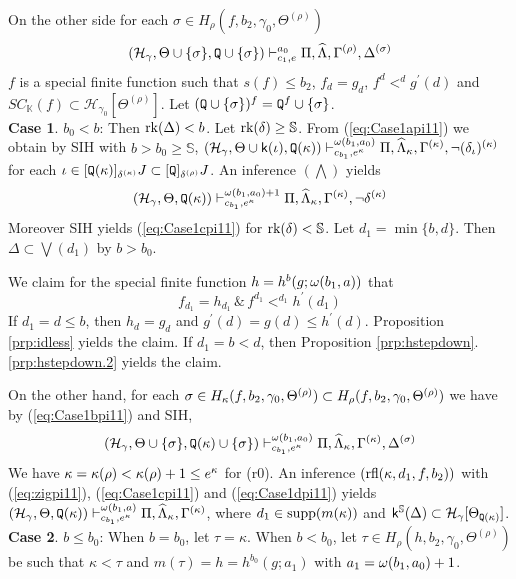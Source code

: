 \documentclass{article}
\newcommand{\mS}{\mathbb{S}}
\newcommand{\mK}{\mathbb{K}}
\begin{document}
On the other side for each $\sigma\in H_{\rho}(f,b_{2},\gamma_{0},\Theta^{(\rho)})$
\begin{equation}\label{eq:Case1bpi11}
(\mathcal{H}_{\gamma},\Theta\cup\{\sigma\},
{\tt Q}\cup\{\sigma\}
)
\vdash^{a_{0}}_{c_{1},e}
\Pi,\widehat{\Lambda},\Gamma^{(\rho)},  \Delta^{(\sigma)}
\end{equation}
$f$ is a special finite function such that $s(f)\leq b_{2}$,
$f_{d}=g_{d}$, $f^{d}<^{d}g^{\prime}(d)$ and
$SC_{\mK}(f)\subset\mathcal{H}_{\gamma_{0}}[\Theta^{(\rho)}]$.
Let $({\tt Q}\cup\{\sigma\})^{f}={\tt Q}^{f}\cup\{\sigma\}$.
\\
\textbf{Case 1}. 
$b_{0}<b$:
Then ${\rm rk}(\Delta)<b$.
Let $\rk(\del)\geq\mS$.
From (\ref{eq:Case1api11}) 
we obtain by SIH with $b>b_{0}\geq\mathbb{S}$,
$(\mathcal{H}_{\gamma},\Theta\cup{\sf k}(\iota),
{\tt Q}(\kappa)
)
\vdash^{\omega(b_{1},a_{0})}_{c_{b_{1}},e^{\kappa}}
\Pi,\widehat{\Lambda}_{\kappa},\Gamma^{(\kappa)},\lnot(\delta_{\iota})^{(\kappa)}$
for each $\iota\in [{\tt Q}(\kappa)]_{\delta^{(\kappa)}}J\subset [{\tt Q}]_{\delta^{(\rho)}}J$.
An inference $(\bigwedge)$ yields
\begin{equation}\label{eq:Case1cpi11}
(\mathcal{H}_{\gamma},\Theta,
{\tt Q}(\kappa)
)
\vdash^{\omega(b_{1},a_{0})+1}_{c_{b_{1}},e^{\kappa}}
\Pi,\widehat{\Lambda}_{\kappa},\Gamma^{(\kappa)},\lnot\delta^{(\kappa)}
\end{equation}
Moreover SIH yields (\ref{eq:Case1cpi11}) for $\rk(\del)<\mS$.
Let 
$d_{1}=\min\{b,d\}$.
Then $\Delta\subset\bigvee(d_{1})$ by $b> b_{0}$.

We claim for the special finite function $h=h^{b}(g;\omega(b_{1},a))$ that
\begin{equation}\label{eq:zigpi11}
f_{d_{1}}=h_{d_{1}} \,\&\,
f^{d_{1}}<^{d_{1}}h^{\prime}(d_{1})
\end{equation}
If $d_{1}=d\leq b$, then $h_{d}=g_{d}$ and $g^{\prime}(d)=g(d)\leq h^{\prime}(d)$.
Proposition \ref{prp:idless} yields the claim.
If $d_{1}=b< d$, then Proposition \ref{prp:hstepdown}.\ref{prp:hstepdown.2}
yields the claim.

On the other hand, for each 
$\sigma\in H_{\kappa}(f,b_{2}, \gamma_{0},\Theta^{(\rho)})\subset H_{\rho}(f,b_{2},\gamma_{0},\Theta^{(\rho)})$
we have by (\ref{eq:Case1bpi11}) and SIH,
\begin{equation}\label{eq:Case1dpi11}
(\mathcal{H}_{\gamma},\Theta\cup\{\sigma\},
{\tt Q}(\kappa)\cup\{\sigma\}
)
\vdash^{\omega(b_{1},a_{0})}_{c_{b_{1}},e^{\kappa}}
\Pi,\widehat{\Lambda}_{\kappa},\Gamma^{(\kappa)},  \Delta^{(\sigma)}
\end{equation}
We have $\kappa=\kappa(\rho)<\kappa(\rho)+1\leq e^{\kappa}$ for (r0).
An inference $({\rm rfl}(\kappa,d_{1},f,b_{2}))$ with (\ref{eq:zigpi11}), (\ref{eq:Case1cpi11}) and (\ref{eq:Case1dpi11}) yields
$
(\mathcal{H}_{\gamma},\Theta,
{\tt Q}(\kappa)
)
\vdash^{\omega(b_{1},a)}_{c_{b_{1}},e^{\kappa}}
\Pi,\widehat{\Lambda}_{\kappa},\Gamma^{(\kappa)}
$, where $d_{1}\in {\rm supp}(m(\kappa))$ and $\sfk^{\mS}(\Del)\subset\calh_{\gam}[\Tht_{{\tt Q}(\kap)}]$.
\\
\textbf{Case 2}. $b\leq b_{0}$:
When $b=b_{0}$, let $\tau=\kappa$.
When $b<b_{0}$, let
$\tau\in H_{\rho}(h,b_{2}, \gamma_{0},\Theta^{(\rho)})$
be such that
$\kappa<\tau$ and  $m(\tau)=h=h^{b_{0}}(g;a_{1})$
with $a_{1}=\omega(b_{1},a_{0})+1$.
\end{document}
